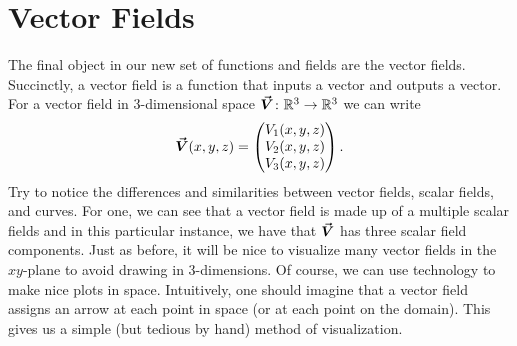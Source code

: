                 \section{Vector Fields}
                
                The final object in our new set of functions and fields are the vector fields. Succinctly, a vector field is a function that inputs a vector and outputs a vector. For a vector field in 3-dimensional space $\boldsymbol{\vec{V}} \colon \mathbb{R}^3 \to \mathbb{R}^3$ we can write
                \[
                \boldsymbol{\vec{V}}(x,y,z)=\begin{pmatrix} V_1(x,y,z)\\ V_2(x,y,z) \\ V_3(x,y,z)\end{pmatrix}.
                \]
                Try to notice the differences and similarities between vector fields, scalar fields, and curves.  For one, we can see that a vector field is made up of a multiple scalar fields and in this particular instance, we have that $\boldsymbol{\vec{V}}$ has three scalar field components.  Just as before, it will be nice to visualize many vector fields in the $xy$-plane to avoid drawing in 3-dimensions. Of course, we can use technology to make nice plots in space. Intuitively, one should imagine that a vector field assigns an arrow at each point in space (or at each point on the domain).  This gives us a simple (but tedious by hand) method of visualization.
                
